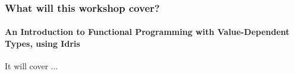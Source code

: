 \begin{frame}
\frametitle{What will this workshop cover?}
\framesubtitle{An Introduction to Functional Programming with Value-Dependent Types, using Idris}

It will cover ...


\end{frame}
